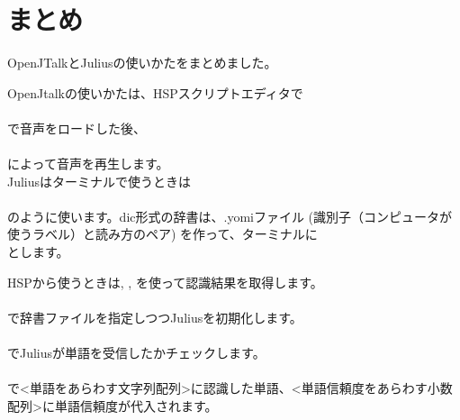 \section{まとめ}
OpenJTalkとJuliusの使いかたをまとめました。

OpenJtalkの使いかたは、HSPスクリプトエディタで\\
\\
で音声をロードした後、\\
\\
によって音声を再生します。\\

Juliusはターミナルで使うときは\\
\\
のように使います。dic形式の辞書は、.yomiファイル (識別子（コンピュータが使うラベル）と読み方のペア) を作って、ターミナルに\\
とします。

HSPから使うときは, ,  を使って認識結果を取得します。\\
\\
で辞書ファイルを指定しつつJuliusを初期化します。\\
\\
でJuliusが単語を受信したかチェックします。\\
\\
で<単語をあらわす文字列配列>に認識した単語、<単語信頼度をあらわす小数配列>に単語信頼度が代入されます。
